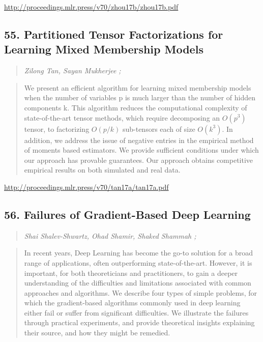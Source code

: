 \documentclass{article}
\begin{document}
\href{http://proceedings.mlr.press/v70/zhou17b/zhou17b.pdf}{http://proceedings.mlr.press/v70/zhou17b/zhou17b.pdf}

\subsection{55. Partitioned Tensor Factorizations for Learning Mixed Membership Models}

\begin{quote}
\footnotesize{\textit{Zilong Tan, Sayan Mukherjee ;}}

\end{quote}

\begin{quote}
    We present an efficient algorithm for learning mixed membership models when the number of variables p is much larger than the number of hidden components k. This algorithm reduces the computational complexity of state-of-the-art tensor methods, which require decomposing an $O(p^3)$ tensor, to factorizing $O(p/k)$ sub-tensors each of size $O(k^3)$. In addition, we address the issue of negative entries in the empirical method of moments based estimators. We provide sufficient conditions under which our approach has provable guarantees. Our approach obtains competitive empirical results on both simulated and real data.  
\end{quote}

\href{http://proceedings.mlr.press/v70/tan17a/tan17a.pdf}{http://proceedings.mlr.press/v70/tan17a/tan17a.pdf}

\subsection{56. Failures of Gradient-Based Deep Learning}

\begin{quote}
\footnotesize{\textit{Shai Shalev-Shwartz, Ohad Shamir, Shaked Shammah ;}}

\end{quote}

\begin{quote}
    In recent years, Deep Learning has become the go-to solution for a broad range of applications, often outperforming state-of-the-art. However, it is important, for both theoreticians and practitioners, to gain a deeper understanding of the difficulties and limitations associated with common approaches and algorithms. We describe four types of simple problems, for which the gradient-based algorithms commonly used in deep learning either fail or suffer from significant difficulties. We illustrate the failures through practical experiments, and provide theoretical insights explaining their source, and how they might be remedied.  
\end{quote}
\end{document}

